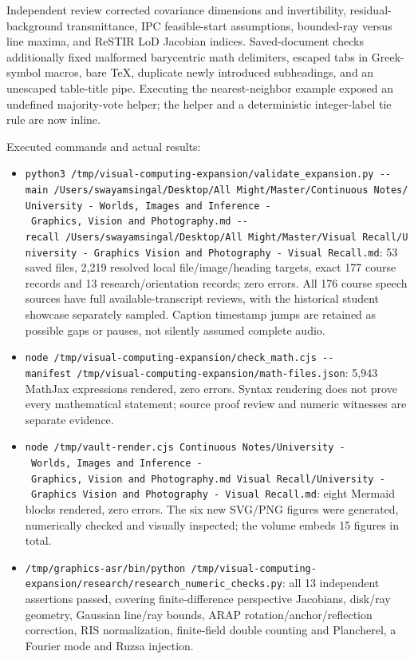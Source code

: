 Independent review corrected covariance dimensions and invertibility, residual-background transmittance, IPC feasible-start assumptions, bounded-ray versus line maxima, and ReSTIR LoD Jacobian indices. Saved-document checks additionally fixed malformed barycentric math delimiters, escaped tabs in Greek-symbol macros, bare TeX, duplicate newly introduced subheadings, and an unescaped table-title pipe. Executing the nearest-neighbor example exposed an undefined majority-vote helper; the helper and a deterministic integer-label tie rule are now inline.

Executed commands and actual results:

\begin{itemize}
\tightlist
\item
  \texttt{python3\ /tmp/visual-computing-expansion/validate\_expansion.py\ -\/-main\ \textquotesingle{}/Users/swayamsingal/Desktop/All\ Might/Master/Continuous\ Notes/University\ -\ Worlds,\ Images\ and\ Inference\ -\ Graphics,\ Vision\ and\ Photography.md\textquotesingle{}\ -\/-recall\ \textquotesingle{}/Users/swayamsingal/Desktop/All\ Might/Master/Visual\ Recall/University\ -\ Graphics\ Vision\ and\ Photography\ -\ Visual\ Recall.md\textquotesingle{}}: 53 saved files, 2,219 resolved local file/image/heading targets, exact 177 course records and 13 research/orientation records; zero errors. All 176 course speech sources have full available-transcript reviews, with the historical student showcase separately sampled. Caption timestamp jumps are retained as possible gaps or pauses, not silently assumed complete audio.
\item
  \texttt{node\ /tmp/visual-computing-expansion/check\_math.cjs\ -\/-manifest\ /tmp/visual-computing-expansion/math-files.json}: 5,943 MathJax expressions rendered, zero errors. Syntax rendering does not prove every mathematical statement; source proof review and numeric witnesses are separate evidence.
\item
  \texttt{node\ /tmp/vault-render.cjs\ \textquotesingle{}Continuous\ Notes/University\ -\ Worlds,\ Images\ and\ Inference\ -\ Graphics,\ Vision\ and\ Photography.md\textquotesingle{}\ \textquotesingle{}Visual\ Recall/University\ -\ Graphics\ Vision\ and\ Photography\ -\ Visual\ Recall.md\textquotesingle{}}: eight Mermaid blocks rendered, zero errors. The six new SVG/PNG figures were generated, numerically checked and visually inspected; the volume embeds 15 figures in total.
\item
  \texttt{/tmp/graphics-asr/bin/python\ /tmp/visual-computing-expansion/research/research\_numeric\_checks.py}: all 13 independent assertions passed, covering finite-difference perspective Jacobians, disk/ray geometry, Gaussian line/ray bounds, ARAP rotation/anchor/reflection correction, RIS normalization, finite-field double counting and Plancherel, a Fourier mode and Ruzsa injection.

\end{itemize}
